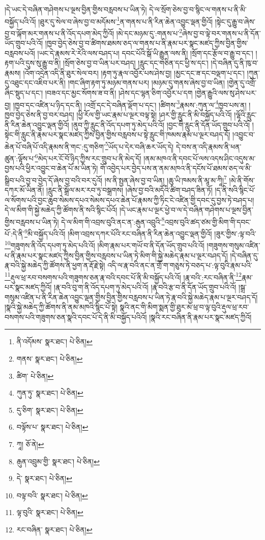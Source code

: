 །དེ་ཡང་དེ་བཞིན་གཤེགས་པ་ལྔས་བྱིན་གྱིས་བརླབས་པ་ཡིན་ཏེ། དེ་ལ་སྲོག་ཅེས་བྱ་བ་སྙིང་ལ་གནས་པ་ནི་མི་བསྐྱོད་པའི་འོ། །ཐུར་དུ་སེལ་བ་ཞེས་བྱ་བ་མདོམས་\footnote{ནི་འདོམས་  སྣར་ཐང་།  པེ་ཅིན། }ན་གནས་པ་ནི་རིན་ཆེན་འབྱུང་ལྡན་གྱིའོ། །སྟེང་དུ་རྒྱུ་བ་ཞེས་བྱ་བ་ལྐོག་མར་གནས་པ་ནི་འོད་དཔག་མེད་ཀྱིའོ། །མེ་དང་མཉམ་དུ་:གནས་པ་\footnote{གནས་  སྣར་ཐང་།  པེ་ཅིན། }ཞེས་བྱ་བ་ལྟེ་བར་གནས་པ་ནི་དོན་ཡོད་གྲུབ་པའི་འོ། །ཁྱབ་བྱེད་ཅེས་བྱ་བ་ཚིགས་ཐམས་ཅད་ལ་གནས་པ་ནི་རྣམ་པར་སྣང་མཛད་ཀྱིས་བྱིན་གྱིས་བརླབས་པའོ། །ཡང་དེ་རྣམས་རེ་རེའི་ལས་བཤད་པ། དབང་པོའི་སྒོ་ཡི་རྒྱུན་ལས་ནི། །སྲོག་དང་རྩོལ་བ་རྒྱུ་བ་དང་། །
རྟག་པའི་དུས་སུ་རྒྱུ་བ་ནི། །སྲོག་ཅེས་བྱ་བ་ཡིན་པར་བཤད། །རླུང་དང་གཅིན་དང་ཕྱི་ས་དང་། །དེ་བཞིན་དུ་ནི་ཁུ་བ་རྣམས། །འོག་འདྲེན་འདི་ནི་ཐུར་སེལ་བར། །རྟག་ཏུ་རྣལ་འབྱོར་པས་ཤེས་བྱ། །མྱང་དང་ཟ་དང་བལྡག་པ་དང་། །ཀུན་དུ་འཐུང་དང་འཇིབ་པར་ནི། །གང་ཞིག་རྟག་ཏུ་མཉམ་གནས་པར། །མཉམ་དུ་གནས་ཞེས་བྱ་བ་ཡིན། །གྱེན་དུ་འགྲོ་ཞིང་སྡུད་པ་དང་། །བཟའ་དང་མྱང་སོགས་ཟ་བ་ནི། །ཤེས་དང་ལྷན་ཅིག་འབྱོར་པ་དག །གྱེན་རྒྱུའི་ལས་སུ་ཤེས་པར་བྱ། །ཁྱབ་དང་འཛིན་པ་ཉིད་དང་ནི། །འགྲོ་དང་དེ་བཞིན་ལྡོག་པ་དང་། །ཚིགས་\footnote{ཚིག་  པེ་ཅིན། }རྣམས་:ཀུན་ལ་\footnote{ཀུན་ཏུ་  སྣར་ཐང་།  པེ་ཅིན། }ཁྱབ་པས་ན། །ཁྱབ་བྱེད་ཅེས་ནི་བྱ་བར་བཤད། །ཕྱི་རོལ་གྱི་ཡང་རྣམ་པ་ལྔར་བལྟ་སྟེ། །ཤར་གྱི་རླུང་ནི་མི་བསྐྱོད་པའི་འོ། །ལྷོའི་རླུང་ནི་རིན་ཆེན་འབྱུང་ལྡན་གྱིའོ། །ནུབ་ཀྱི་རླུང་ནི་འོད་དཔག་ཏུ་མེད་པའི་འོ། །བྱང་གི་རླུང་ནི་དོན་ཡོད་གྲུབ་པའི་འོ། །སྟེང་གི་རླུང་ནི་རྣམ་པར་སྣང་མཛད་ཀྱིས་བྱིན་གྱིས་བརླབས་པ་སྟེ་རླུང་གི་ཁམས་རྣམ་པ་ལྔར་བཤད་དོ། །འབྱུང་བ་ཆེན་པོ་བཞི་པོ་འདི་རྣམས་ནི་གང་:དུ་གཅིག་\footnote{དུ་ཅིག་  སྣར་ཐང་།  པེ་ཅིན། }ཡོད་པ་དེར་བཞི་ཆར་ཡོད་དེ། དེ་བས་ན་འདི་རྣམས་ནི་ཕན་ཚུན་:ལྟོས་པ་\footnote{བལྟོས་པ་  སྣར་ཐང་།  པེ་ཅིན། }མེད་པར་ངོ་བོ་ཉིད་ཀྱིས་རང་གྲུབ་པ་ནི་མེད་དོ། །ནམ་མཁའ་ནི་དབང་པོ་ལས་འདས་ཤིང་འདུས་མ་བྱས་པའི་ཕྱིར་འབྱུང་བ་ཆེན་པོ་མ་ཡིན་ཏེ། གོ་འབྱེད་པར་བྱེད་པས་ན་ནམ་མཁའ་ནི་དངོས་པོ་ཐམས་ཅད་ལ་མི་སྒྲིབ་པའི་བྱ་བ་བྱེད་དོ་ཞེས་བྱ་བའི་བར་དུའོ། །ས་ནི་སྤྱན་ཞེས་བྱ་བ་ཡིན། །ཆུ་ཡི་ཁམས་ནི་མཱ་མ་ཀཱི།\footnote{ཀཱ།  ཅོ་ནེ། } །མེ་ནི་གོས་དཀར་མོ་ཡིན་ནོ། །རླུང་ནི་སྒྲོལ་མར་རབ་ཏུ་བསྒྲགས། །ཞེས་བྱ་བའི་མདོའི་ཚིག་བཤད་ཟིན་ཏོ། །ད་ནི་སའི་སྙིང་པོ་ལ་སོགས་པའི་བྱང་ཆུབ་སེམས་དཔའ་སེམས་དཔའ་ཆེན་པོ་རྣམས་ཀྱི་ཏིང་ངེ་འཛིན་གྱི་དབང་དུ་བྱས་ཏེ་བཤད་པ། དེ་ལ་མིག་གི་སྐྱེ་མཆེད་ཀྱི་ཚོགས་ནི་སའི་སྙིང་པོའོ། །དེ་ཡང་རྣམ་པ་ལྔར་ཕྱེ་བ་ལ་དེ་བཞིན་གཤེགས་པ་ལྔས་བྱིན་གྱིས་བརླབས་པ་ཡིན་ཏེ། དེ་ལ་མིག་གི་འབྲས་བུའི་ནང་ན་:རྒུན་འབྲུའི་\footnote{རྒུན་འབྲུམ་གྱི་  སྣར་ཐང་།  པེ་ཅིན། }འབྲས་བུའི་ཚད་ཙམ་གྱི་མིག་གི་དབང་པོ་:དེ་ནི་\footnote{དེ་  སྣར་ཐང་།  པེ་ཅིན། }མི་བསྐྱོད་པའི་འོ། །མིག་འབྲས་དཀར་པོའི་རང་བཞིན་ནི་རིན་ཆེན་འབྱུང་ལྡན་གྱིའོ། །ཟུར་གྱིས་:ལྟ་བའི་\footnote{བལྟ་བའི་  སྣར་ཐང་།  པེ་ཅིན། }གཟུགས་ནི་འོད་དཔག་ཏུ་མེད་པའི་འོ། །མིག་རྣམ་པར་གཡོ་བ་ནི་དོན་ཡོད་གྲུབ་པའི་འོ། །གཟུགས་གསུམ་འཛིན་པ་ནི་རྣམ་པར་སྣང་མཛད་ཀྱིས་བྱིན་གྱིས་བརླབས་པ་ཡིན་ཏེ་མིག་གི་སྐྱེ་མཆེད་རྣམ་པ་ལྔར་བཤད་དོ། །དེ་བཞིན་དུ་རྣ་བའི་སྐྱེ་མཆེད་ཀྱི་ཚོགས་ནི་ཕྱག་ན་རྡོ་རྗེ་སྟེ། འདི་ལ་རྣ་བའི་ནང་ན་གྲོ་ག་གཅུས་ཏེ་བཅད་པ་:ལྟ་བུའི་རྣམ་པའི་\footnote{ལྟ་བུའི་  སྣར་ཐང་།  པེ་ཅིན། }རྡུལ་ཕྲ་རབ་བསགས་པའི་གཟུགས་ཅན་རྣ་བའི་དབང་པོ་ནི་མི་བསྐྱོད་པའི་འོ། །རྣ་བའི་:རང་བཞིན་ནི་\footnote{རང་བཞིན་  སྣར་ཐང་།  པེ་ཅིན། }རྣམ་པར་སྣང་མཛད་ཀྱིའོ། །རྣ་བའི་བུ་ག་ནི་འོད་དཔག་ཏུ་མེད་པའི་འོ། །རྣ་བའི་རྩ་བ་ནི་དོན་ཡོད་གྲུབ་པའི་འོ། །སྒྲ་གསུམ་འཛིན་པ་ནི་རིན་ཆེན་འབྱུང་ལྡན་གྱིས་བྱིན་གྱིས་བརླབས་པ་ཡིན་ཏེ་རྣ་བའི་སྐྱེ་མཆེད་རྣམ་པ་ལྔར་བཤད་དོ། །སྣའི་སྐྱེ་མཆེད་ཀྱི་ཚོགས་ནི་ནམ་མཁའི་སྙིང་པོ་སྟེ། སྣའི་ནང་གི་མིག་སྨན་གྱི་ཐུར་མ་ཕྲ་བ་ལྟ་བུའི་རྡུལ་ཕྲ་རབ་བསགས་པའི་གཟུགས་ཅན་སྣའི་དབང་པོ་དེ་ནི་མི་བསྐྱོད་པའིའོ། །སྣའི་རང་བཞིན་ནི་རྣམ་པར་སྣང་མཛད་ཀྱིའོ། 